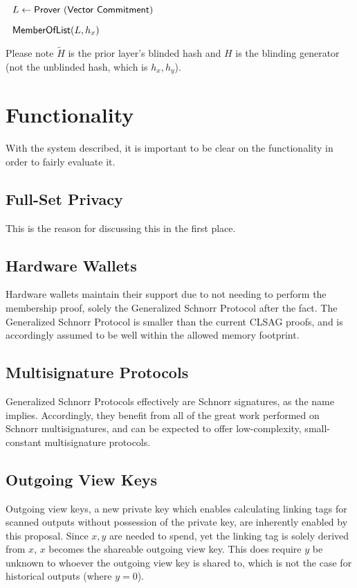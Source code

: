\documentclass[]{article}
\begin{document}
$ $

$~~L\leftarrow \mathsf{Prover ~(Vector ~Commitment)}$

$~~\mathsf{MemberOfList}(L, h_x)$

Please note $\tilde{H}$ is the prior layer's blinded hash and $H$ is the blinding generator (not the unblinded hash, which is $h_x, h_y$).

\section{Functionality}

With the system described, it is important to be clear on the functionality in order to fairly evaluate it.

\subsection{Full-Set Privacy}

This is the reason for discussing this in the first place.

\subsection{Hardware Wallets}

Hardware wallets maintain their support due to not needing to perform the membership proof, solely the Generalized Schnorr Protocol after the fact. The Generalized Schnorr Protocol is smaller than the current CLSAG proofs, and is accordingly assumed to be well within the allowed memory footprint.

\subsection{Multisignature Protocols}

Generalized Schnorr Protocols effectively are Schnorr signatures, as the name implies. Accordingly, they benefit from all of the great work performed on Schnorr multisignatures, and can be expected to offer low-complexity, small-constant multisignature protocols.

\subsection{Outgoing View Keys}

Outgoing view keys, a new private key which enables calculating linking tags for scanned outputs without possession of the private key, are inherently enabled by this proposal. Since $x, y$ are needed to spend, yet the linking tag is solely derived from $x$, $x$ becomes the shareable outgoing view key. This does require $y$ be unknown to whoever the outgoing view key is shared to, which is not the case for historical outputs (where $y = 0$).
\end{document}

